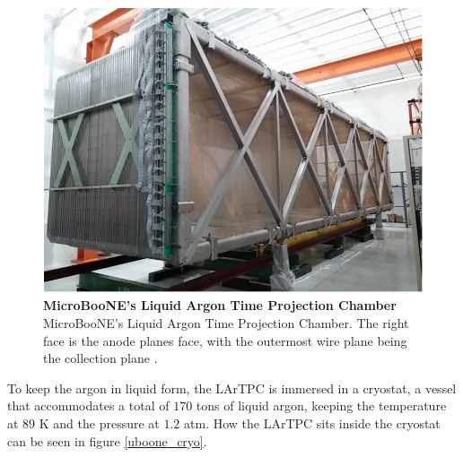 \begin{figure}[h!]
	\begin{center}
		\includegraphics[scale=0.6]{Figures/uboone_LArTPC.png}
		\caption[MicroBooNE's Liquid Argon Time Projection Chamber]{{\textbf{MicroBooNE's Liquid Argon Time Projection Chamber}} \\MicroBooNE's Liquid Argon Time Projection Chamber. The right face is the anode planes face, with the outermost wire plane being the collection plane \cite{microboone_design}.}
		\label{uboone_lartpc}	
	\end{center}
\end{figure}

To keep the argon in liquid form, the LArTPC is immersed in a cryostat, a vessel that accommodates a total of $170$ tons of liquid argon, keeping the temperature at $89$ K and the pressure at $1.2$ atm. How the LArTPC sits inside the cryostat can be seen in figure \ref{uboone_cryo}.

